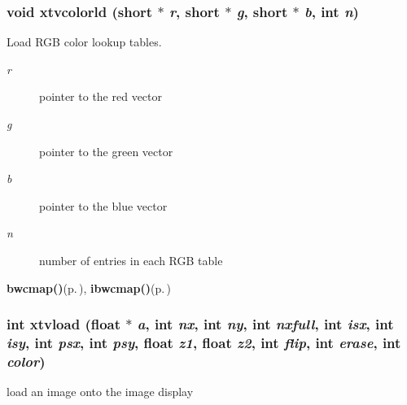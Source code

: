\subsubsection{\setlength{\rightskip}{0pt plus 5cm}void xtvcolorld (short $\ast$ {\em r}, short $\ast$ {\em g}, short $\ast$ {\em b}, int {\em n})}\label{xtv_8h_a129}


Load RGB color lookup tables. 

\begin{Desc}
\item[Parameters:]
\begin{description}
\item[{\em r}]pointer to the red vector \item[{\em g}]pointer to the green vector \item[{\em b}]pointer to the blue vector \item[{\em n}]number of entries in each RGB table\end{description}
\end{Desc}
\begin{Desc}
\item[See also:]{\bf bwcmap()}{\rm (p.\,\pageref{xtv_8c_a7})}, {\bf ibwcmap()}{\rm (p.\,\pageref{xtv_8c_a8})} \end{Desc}
\subsubsection{\setlength{\rightskip}{0pt plus 5cm}int xtvload (float $\ast$ {\em a}, int {\em nx}, int {\em ny}, int {\em nxfull}, int {\em isx}, int {\em isy}, int {\em psx}, int {\em psy}, float {\em z1}, float {\em z2}, int {\em flip}, int {\em erase}, int {\em color})}\label{xtv_8h_a128}


load an image onto the image display 

